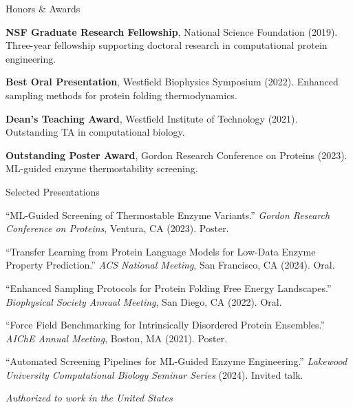 \documentclass{resume}
\begin{document}
\begin{rSection2}{Honors \& Awards}
\item \textbf{NSF Graduate Research Fellowship}, National Science Foundation (2019). Three-year fellowship supporting doctoral research in computational protein engineering.
\item \textbf{Best Oral Presentation}, Westfield Biophysics Symposium (2022). Enhanced sampling methods for protein folding thermodynamics.
\item \textbf{Dean's Teaching Award}, Westfield Institute of Technology (2021). Outstanding TA in computational biology.
\item \textbf{Outstanding Poster Award}, Gordon Research Conference on Proteins (2023). ML-guided enzyme thermostability screening.
\end{rSection2}
\vspace{-0.15cm}

\begin{rSection2}{Selected Presentations}
\item ``ML-Guided Screening of Thermostable Enzyme Variants.'' \textit{Gordon Research Conference on Proteins}, Ventura, CA (2023). Poster.
\item ``Transfer Learning from Protein Language Models for Low-Data Enzyme Property Prediction.'' \textit{ACS National Meeting}, San Francisco, CA (2024). Oral.
\item ``Enhanced Sampling Protocols for Protein Folding Free Energy Landscapes.'' \textit{Biophysical Society Annual Meeting}, San Diego, CA (2022). Oral.
\item ``Force Field Benchmarking for Intrinsically Disordered Protein Ensembles.'' \textit{AIChE Annual Meeting}, Boston, MA (2021). Poster.
\item ``Automated Screening Pipelines for ML-Guided Enzyme Engineering.'' \textit{Lakewood University Computational Biology Seminar Series} (2024). Invited talk.
\end{rSection2}
\vspace{-0.1cm}

\begin{center}
\vspace{0.15cm}
\textit{Authorized to work in the United States}
\end{center}
\end{document}
